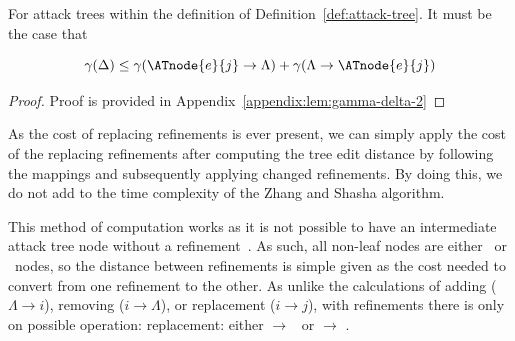 \begin{lemma}\label{lem:gamma-delta-2}
    For attack trees within the definition of Definition~\ref{def:attack-tree}. It must be the case that

    \[\gamma(\Delta) \le \gamma(\ATnode{e}{j} \rightarrow {\Lambda}) + \gamma(\Lambda \rightarrow {\ATnode{e}{j}})\]

    \begin{proof}
        Proof is provided in Appendix~\ref{appendix:lem:gamma-delta-2}
      \end{proof}

    

\end{lemma}






As the cost of replacing refinements is ever present, we can simply apply the cost of the replacing refinements after computing the tree edit distance by following the mappings and subsequently applying changed refinements. By doing this, we do not add to the time complexity of the Zhang and Shasha algorithm.

This method of computation works as it is not possible to have an intermediate attack tree node without a refinement~\cite{mauw_foundations_2006}. As such, all non-leaf nodes are either \AND\ or \OR\ nodes, so the distance between refinements is simple given as the cost needed to convert from one refinement to the other. As unlike the calculations of adding ($\Lambda \rightarrow i$), removing ($i \rightarrow \Lambda$), or replacement ($i \rightarrow j$), with refinements there is only on possible operation: replacement: either \AND $\rightarrow$ \OR\ or \OR $\rightarrow$ \AND.

